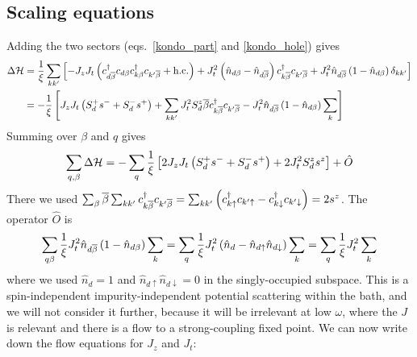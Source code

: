 \documentclass[12pt,twoside]{article}
\numberwithin{equation}{section}
\begin{document}
\subsection{Scaling equations}
Adding the two sectors (eqs.~\ref{kondo_part} and \ref{kondo_hole}) gives
\begin{equation}\begin{aligned}
	\Delta \mathcal{H} &= \frac{1}{\xi}\sum_{kk^\prime} \left[ - J_z J_t\left(c^\dagger_{d\overline\beta}c_{d\beta}c^\dagger_{k\beta}c_{k^\prime\overline\beta} + \text{h.c.}\right) + J_t^2 \left(\hat n_{d\beta} - \hat n_{d\overline\beta}\right) c^\dagger_{k\overline\beta}c_{k^\prime\overline\beta} + J_t^2 \hat n_{d\overline\beta}\left(1 - \hat n_{d\beta}\right) \delta_{kk^\prime}\right]\\
		    &= -\frac{1}{\xi}\left[ J_z J_t\left(S_d^+ s^- + S_d^- s^+\right) + \sum_{kk^\prime} J_t^2 S_d^z \overline\beta c^\dagger_{k\overline\beta}c_{k^\prime\overline\beta} - J_t^2 \hat n_{d\overline\beta}\left(1 - \hat n_{d\beta}\right) \sum_{k} \right]\\
\end{aligned}\end{equation}
Summing over \(\beta\) and \(q\) gives
\begin{equation}\begin{aligned}
	\sum_{q,\beta} \Delta \mathcal{H} = - \sum_q \frac{1}{\xi} \left[2J_z J_t \left( S_d^+ s^- + S_d^- s^+ \right) + 2J_t^2 S_d^z s^z\right] + \hat O
\end{aligned}\end{equation}
There we used \(\sum_\beta \overline\beta \sum_{kk^\prime}c^\dagger_{k\overline\beta}c_{k^\prime\overline\beta} = \sum_{kk^\prime}\left(c^\dagger_{k\uparrow}c_{k^\prime\uparrow} - c^\dagger_{k\downarrow}c_{k^\prime\downarrow}\right)  = 2s^z\). The operator \(\hat O\) is
\begin{equation}\begin{aligned}
	\sum_{q\beta} \frac{1}{\xi} J_t^2 \hat n_{d\overline\beta}\left(1 - \hat n_{d\beta}\right) \sum_{k} = \sum_q \frac{1}{\xi} J_t^2 \left(\hat n_d - \hat n_{d \uparrow} \hat n_{d \downarrow}\right) \sum_k = \sum_q\frac{1}{\xi} J_t^2 \sum_k
\end{aligned}\end{equation}
where we used \(\hat n_d = 1\) and \(\hat n_{d \uparrow} \hat n_{d \downarrow} = 0\) in the singly-occupied subspace. This is a spin-independent impurity-independent potential scattering  within the bath, and we will not consider it further, because it will be irrelevant at low \(\omega\), where the \(J\) is relevant and there is a flow to a strong-coupling fixed point.
\pb We can now write down the flow equations for \(J_z\) and \(J_t\):
\end{document}
